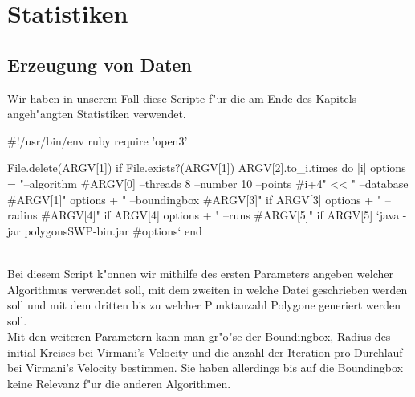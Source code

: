 \section{Statistiken}
  \subsection{Erzeugung von Daten}

    Wir haben in unserem Fall diese Scripte f"ur die am Ende des Kapitels 
    angeh"angten Statistiken verwendet.\\
    \begin{code}[caption={Script zur Datenerzeugung},label=listing_datacreation]
#!/usr/bin/env ruby
require 'open3'

File.delete(ARGV[1]) if File.exists?(ARGV[1])
ARGV[2].to_i.times do |i|
  options = "--algorithm #{ARGV[0]} --threads 8 --number 10 --points #{i+4}" <<
    " --database #{ARGV[1]}"
  options + " --boundingbox #{ARGV[3]}" if ARGV[3]
  options + " --radius #{ARGV[4]}" if ARGV[4]
  options + " --runs #{ARGV[5]}" if ARGV[5]
  `java -jar polygonsSWP-bin.jar #{options}`
end
    \end{code}\\
    Bei diesem Script k"onnen wir mithilfe des ersten Parameters angeben 
    welcher Algorithmus verwendet soll, mit dem zweiten in welche Datei 
    geschrieben werden soll und mit dem dritten bis zu welcher Punktanzahl 
    Polygone generiert werden soll.\\
    Mit den weiteren Parametern kann man gr"o"se der Boundingbox, Radius 
    des initial Kreises bei Virmani's Velocity und die anzahl der Iteration
    pro Durchlauf bei Virmani's Velocity bestimmen. Sie haben allerdings
    bis auf die Boundingbox keine Relevanz f"ur die anderen Algorithmen.
